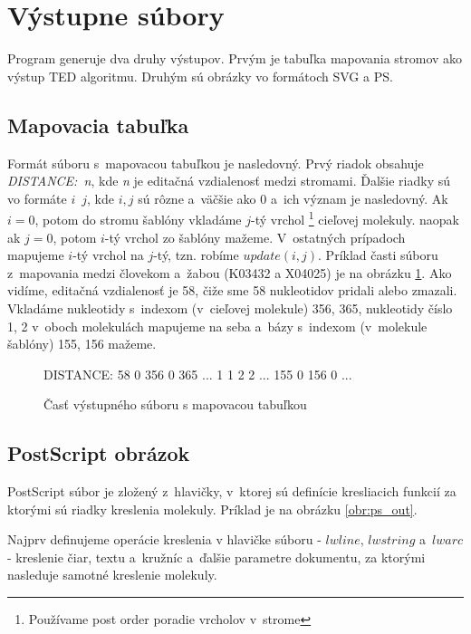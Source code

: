 \section{Výstupne súbory}

Program generuje dva druhy výstupov. Prvým je tabuľka mapovania stromov
ako výstup TED algoritmu. Druhým sú obrázky vo formátoch SVG a PS.

\subsection{Mapovacia tabuľka}

Formát súboru s~mapovacou tabuľkou je nasledovný. Prvý riadok obsahuje
\mbox{\textit{DISTANCE: n}}, kde \textit{n} je editačná vzdialenosť
medzi stromami.
Ďalšie riadky sú vo formáte \mbox{$i$ $j$}, kde \mbox{$i, j$} sú rôzne a~väčšie ako 0
a~ich význam je nasledovný.
Ak \mbox{$i = 0$}, potom do stromu šablóny vkladáme $j$-tý vrchol%
\footnote{Používame post order poradie vrcholov v~strome} cieľovej molekuly.
naopak ak \mbox{$j = 0$}, potom $i$-tý vrchol zo šablóny mažeme. V~ostatných prípadoch
mapujeme $i$-tý vrchol na $j$-tý, tzn. robíme \mbox{$update(i, j)$}.
Príklad časti súboru z~mapovania medzi človekom a~žabou (K03432 a X04025)
je na obrázku \ref{obr:mapping_format}.
Ako vidíme, editačná vzdialenosť je 58, čiže sme 58 nukleotidov pridali alebo zmazali.
Vkladáme nukleotidy s~indexom (v~cieľovej molekule) 356, 365,
nukleotidy číslo 1, 2 v~oboch molekulách mapujeme na seba a~bázy
s~indexom (v~molekule šablóny) 155, 156 mažeme.

\begin{figure}
\begin{code}[fontsize=\scriptsize, frame=none, samepage=true]
DISTANCE: 58
0 356
0 365
  ...
1 1
2 2
  ...
155 0
156 0
  ...
\end{code}
\caption{Časť výstupného súboru s mapovacou tabuľkou}
\label{obr:mapping_format}
\end{figure}




\subsection{PostScript obrázok}

PostScript súbor je zložený z~hlavičky, v~ktorej sú definície kresliacich funkcií za
ktorými sú riadky kreslenia molekuly. Príklad je na obrázku \ref{obr:ps_out}.

Najprv definujeme operácie kreslenia v hlavičke súboru - $lwline$,
$lwstring$ a~$lwarc$ - kreslenie čiar, textu a~kružníc a~ďalšie 
parametre dokumentu, za ktorými nasleduje samotné kreslenie molekuly.

